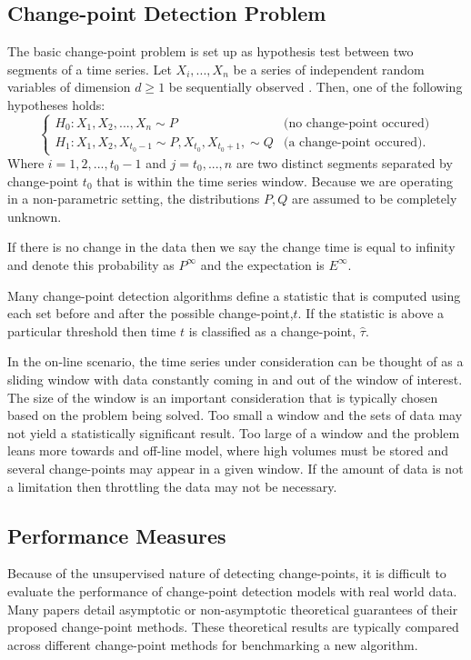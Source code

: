 \subsection{Change-point Detection Problem}
The basic change-point problem is set up as hypothesis test between two segments of a time series. Let $X_i,...,X_n$ be a series of independent random variables of dimension $d \geq 1$ be sequentially observed . Then, one of the following hypotheses holds:
\begin{equation}
  \begin{cases}
    H_0: X_1, X_2, ...,X_n \sim  P & \text{(no change-point occured)} \\
    H_1: X_1,X_2, X_{t_0-1} \sim P, X_{t_0}, X_{t_0+1},  \sim Q & \text{(a change-point occured)}. 
  \end{cases}
\end{equation}
Where $i=1,2,...,t_0-1$ and $j=t_0,...,n$  are two distinct segments separated by change-point $t_0$ that is within the time series window.  Because we are operating in a non-parametric setting, the distributions $P, Q$ are assumed to be completely unknown. 

If there is no change in the data then we say the change time is equal to infinity and denote this probability as $P^{\infty}$ and the expectation is $E^{\infty}$.

Many change-point detection algorithms define a statistic that is computed using each set before and after the possible change-point,$t$. If the statistic is above a particular threshold then time $t$ is classified as a change-point, $\hat{\tau}$.

In the on-line scenario, the time series under consideration can be thought of as a sliding window with data constantly coming in and out of the window of interest. The size of the window is an important consideration that is typically chosen based on the problem being solved. Too small a window and the sets of data may not yield a statistically significant result. Too large of a window and the problem leans more towards and off-line model, where high volumes must be stored and several change-points may appear in a given window. If the amount of data is not a limitation then throttling the data may not be necessary.

\subsection{Performance Measures}
Because of the unsupervised nature of detecting change-points, it is difficult to evaluate the performance of change-point detection models with real world data. Many papers detail asymptotic or non-asymptotic theoretical guarantees of their proposed change-point methods.  These theoretical results are typically compared across different change-point methods for benchmarking a new algorithm.

